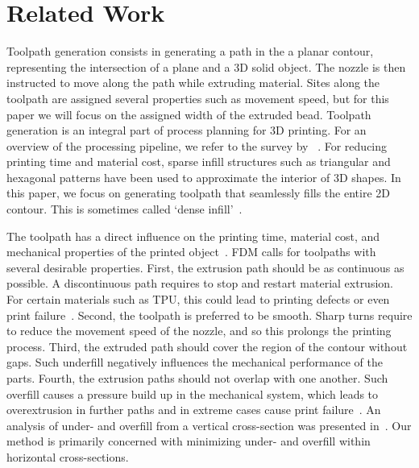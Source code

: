 \section{Related Work}

Toolpath generation consists in generating a path in the a planar contour, representing the intersection of a plane and a 3D solid object.
The nozzle is then instructed to move along the path while extruding material.
Sites along the toolpath are assigned several properties such as movement speed, but for this paper we will focus on the assigned width of the extruded bead.
Toolpath generation is an integral part of process planning for 3D printing.
For an overview of the processing pipeline, we refer to the survey by \citeauthor{Livesu2017CGF}~\cite{Livesu2017CGF}.
For reducing printing time and material cost, sparse infill structures such as triangular and hexagonal patterns have been used to approximate the interior of 3D shapes.
In this paper, we focus on generating toolpath that seamlessly fills the entire 2D contour.
This is sometimes called `dense infill'~\cite{Livesu2017CGF}.

The toolpath has a direct influence on the printing time, material cost, and mechanical properties of the printed object~\cite{N.Turner2014,ahn2002anisotropic}.
FDM calls for toolpaths with several desirable properties.
First, the extrusion path should be as continuous as possible.
A discontinuous path requires to stop and restart material extrusion.
For certain materials such as TPU, this could lead to printing defects or even print failure~\cite{KUIPERS2019CAD}.
Second, the toolpath is preferred to be smooth.
Sharp turns require to reduce the movement speed of the nozzle, and so this prolongs the printing process.
Third, the extruded path should cover the region of the contour without gaps.
Such underfill negatively influences the mechanical performance of the parts.
Fourth, the extrusion paths should not overlap with one another.
Such overfill causes a pressure build up in the mechanical system, which leads to overextrusion in further paths and in extreme cases cause print failure~\cite{KUIPERS2019CAD}.
An analysis of under- and overfill from a vertical cross-section was presented in~\cite{Han2002JMSE}. 
Our method is primarily concerned with minimizing under- and overfill within horizontal cross-sections.


